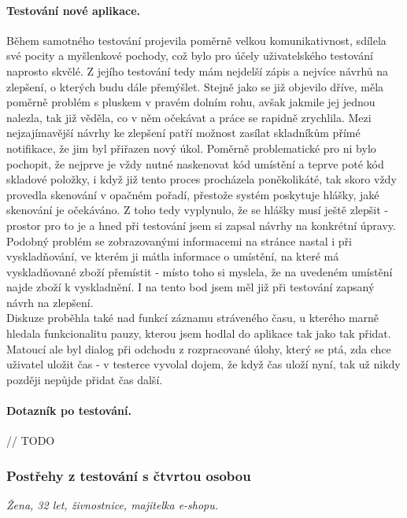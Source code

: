 \paragraph{Testování nové aplikace.} Během samotného testování projevila poměrně velkou komunikativnost, sdílela své pocity a myšlenkové pochody, což bylo pro účely uživatelského testování naprosto skvělé. Z jejího testování tedy mám nejdelší zápis a nejvíce návrhů na zlepšení, o kterých budu dále přemýšlet. Stejně jako se již objevilo dříve, měla poměrně problém s pluskem v pravém dolním rohu, avšak jakmile jej jednou nalezla, tak již věděla, co v něm očekávat a práce se rapidně zrychlila. Mezi nejzajímavější návrhy ke zlepšení patří možnost zasílat skladníkům přímé notifikace, že jim byl přiřazen nový úkol. Poměrně problematické pro ni bylo pochopit, že nejprve je vždy nutné naskenovat kód umístění a teprve poté kód skladové položky, i když již tento proces procházela poněkolikáté, tak skoro vždy provedla skenování v opačném pořadí, přestože systém poskytuje hlášky, jaké skenování je očekáváno. Z toho tedy vyplynulo, že se hlášky musí ještě zlepšit - prostor pro to je a hned při testování jsem si zapsal návrhy na konkrétní úpravy. Podobný problém se zobrazovanými informacemi na stránce nastal i při vyskladňování, ve kterém ji mátla informace o umístění, na které má vyskladňované zboží přemístit - místo toho si myslela, že na uvedeném umístění najde zboží k vyskladnění. I na tento bod jsem měl již při testování zapsaný návrh na zlepšení.\\
Diskuze proběhla také nad funkcí záznamu stráveného času, u kterého marně hledala funkcionalitu pauzy, kterou jsem hodlal do aplikace tak jako tak přidat. Matoucí ale byl dialog při odchodu z rozpracované úlohy, který se ptá, zda chce uživatel uložit čas - v testerce vyvolal dojem, že když čas uloží nyní, tak už nikdy později nepůjde přidat čas další. 

\paragraph{Dotazník po testování.} // TODO


\subsubsection{Postřehy z testování s čtvrtou osobou}
\emph{Žena, 32 let, živnostnice, majitelka e-shopu.}

